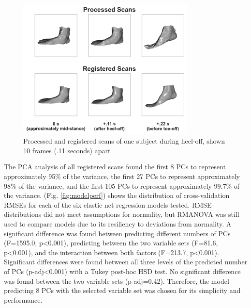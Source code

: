 \documentclass[defaultstyle,11pt]{comps}
\begin{document}
\begin{figure}
\hypertarget{fig:scans}{%
\centering
\includegraphics[width=0.8\textwidth,height=\textheight]{../fig/SA2/scans.png}
\caption{Processed and registered scans of one subject during heel-off, shown 10 frames (.11 seconds) apart}\label{fig:scans}
}
\end{figure}

The PCA analysis of all registered scans found the first 8 PCs to represent approximately 95\% of the variance, the first 27 PCs to represent approximately 98\% of the variance, and the first 105 PCs to represent approximately 99.7\% of the variance.
(Fig. \ref{fig:modelperf}) shows the distribution of cross-validation RMSEs for each of the six elastic net regression models tested.
RMSE distributions did not meet assumptions for normality, but RMANOVA was still used to compare models due to its resiliency to deviations from normality.
A significant difference was found between predicting different numbers of PCs (F=1595.0, p\textless0.001), predicting between the two variable sets (F=81.6, p\textless0.001), and the interaction between both factors (F=213.7, p\textless0.001).
Significant differences were found between all three levels of the predicted number of PCs (p-adj\textless0.001) with a Tukey post-hoc HSD test.
No significant difference was found between the two variable sets (p-adj=0.42).
Therefore, the model predicting 8 PCs with the selected variable set was chosen for its simplicity and performance.
\end{document}
